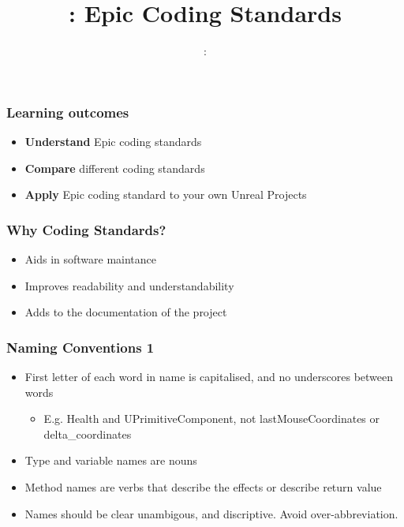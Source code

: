 \usepackage{../../beamerthemeFalmouthGamesAcademy}
\usepackage{multimedia}
\graphicspath{ {../../} }


\usepackage[normalem]{ulem}
\usepackage{wasysym}
\usepackage{listings}
\usepackage{pdfpages}

\usetikzlibrary{arrows,automata}




\title{\sessionnumber: Epic Coding Standards}
\subtitle{\modulecode: \moduletitle}

\frame{\titlepage}

\begin{frame}
	\frametitle{Learning outcomes}
	\begin{itemize}
		\item \textbf{Understand} Epic coding standards
		\item \textbf{Compare} different coding standards
		\item \textbf{Apply} Epic coding standard to your own Unreal Projects
	\end{itemize}
\end{frame}

\begin{frame}
  \frametitle{Why Coding Standards?}
  \begin{itemize}
    \item Aids in software maintance
    \item Improves readability and understandability
    \item Adds to the documentation of the project
  \end{itemize}
\end{frame}

\begin{frame}
  \frametitle{Naming Conventions 1}
  \begin{itemize}
    \item First letter of each word in name is capitalised, and no underscores between words
    \begin{itemize}
      \item E.g. Health and UPrimitiveComponent, not lastMouseCoordinates or delta\_coordinates
    \end{itemize}
    \item Type and variable names are nouns
    \item Method names are verbs that describe the effects or describe return value
    \item Names should be clear unambigous, and discriptive. Avoid over-abbreviation.
  \end{itemize}
\end{frame}

